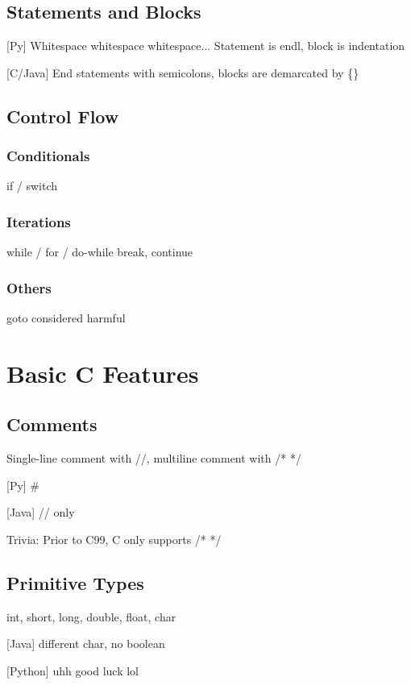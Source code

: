 \documentclass[oneside]{book}
\begin{document}
    
    \section{Statements and Blocks}
    [Py] Whitespace whitespace whitespace...
    Statement is endl, block is indentation

    [C/Java] End statements with semicolons, blocks are demarcated by  \{\}
    
    \section{Control Flow}
        \subsection{Conditionals}
        if / switch
        \subsection{Iterations}
        while / for / do-while
        break, continue
        \subsection{Others}
        goto considered harmful

\chapter{Basic C Features}
    \section{Comments}
    Single-line comment with //, multiline comment with /* */ 
    
    [Py] \#
    
    [Java] // only
    
    Trivia: Prior to C99, C only supports /* */

    
    \section{Primitive Types}
    int, short, long, double, float, char

    [Java] different char, no boolean

    [Python] uhh good luck lol 
\end{document}
